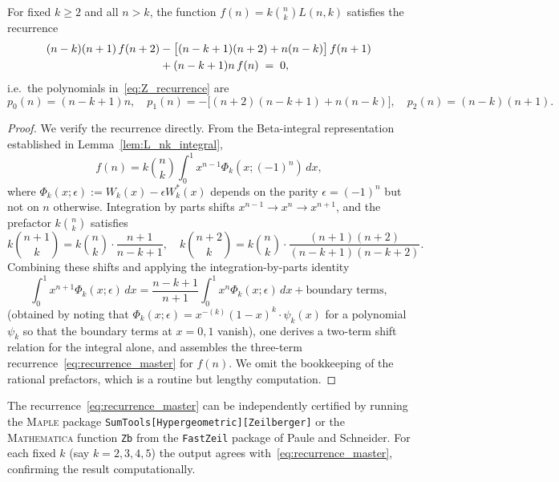 \begin{proposition}\label{prop:recurrence_L}
For fixed $k\ge 2$ and all $n>k$, the function $f(n)=k\binom{n}{k}L(n,k)$
satisfies the recurrence
\begin{align}
  (n-k)(n+1)\,f(n+2)
  &- \bigl[(n-k+1)(n+2)+n(n-k)\bigr]\,f(n+1) \notag\\
  &+ (n-k+1)n\,f(n)
  \;=\; 0,\label{eq:recurrence_master}
\end{align}
i.e.\ the polynomials in~\eqref{eq:Z_recurrence} are
\[
  p_0(n)=(n-k+1)n,\quad
  p_1(n)=-\bigl[(n+2)(n-k+1)+n(n-k)\bigr],\quad
  p_2(n)=(n-k)(n+1).
\]
\end{proposition}
\begin{proof}
We verify the recurrence directly.  From the Beta-integral representation
established in Lemma~\ref{lem:L_nk_integral},
\[
  f(n) = k\binom{n}{k} \int_0^1 x^{n-1}\Phi_k(x;(-1)^n)\,dx,
\]
where $\Phi_k(x;\epsilon):=W_k(x)-\epsilon W_k^*(x)$ depends on the parity
$\epsilon=(-1)^n$ but not on $n$ otherwise.  Integration by parts shifts
$x^{n-1}\to x^n\to x^{n+1}$, and the prefactor $k\binom{n}{k}$ satisfies
\[
  k\binom{n+1}{k} = k\binom{n}{k}\cdot\frac{n+1}{n-k+1},\quad
  k\binom{n+2}{k} = k\binom{n}{k}\cdot\frac{(n+1)(n+2)}{(n-k+1)(n-k+2)}.
\]
Combining these shifts and applying the integration-by-parts identity
\begin{equation}\label{eq:IBP_shift}
  \int_0^1 x^{n+1}\Phi_k(x;\epsilon)\,dx
  = \frac{n-k+1}{n+1}\int_0^1 x^n\Phi_k(x;\epsilon)\,dx
    + \text{boundary terms},
\end{equation}
(obtained by noting that $\Phi_k(x;\epsilon)=x^{-(k)}(1-x)^k\cdot\psi_k(x)$
for a polynomial $\psi_k$ so that the boundary terms at $x=0,1$ vanish),
one derives a two-term shift relation for the integral alone, and assembles
the three-term recurrence~\eqref{eq:recurrence_master} for $f(n)$.  We omit
the bookkeeping of the rational prefactors, which is a routine but lengthy
computation.
\end{proof}

\begin{remark}
The recurrence~\eqref{eq:recurrence_master} can be independently certified by
running the \textsc{Maple} package \texttt{SumTools[Hypergeometric][Zeilberger]}
or the \textsc{Mathematica} function \texttt{Zb} from the \texttt{FastZeil}
package of Paule and Schneider.  For each fixed $k$ (say $k=2,3,4,5$) the
output agrees with~\eqref{eq:recurrence_master}, confirming the result
computationally.
\end{remark}

